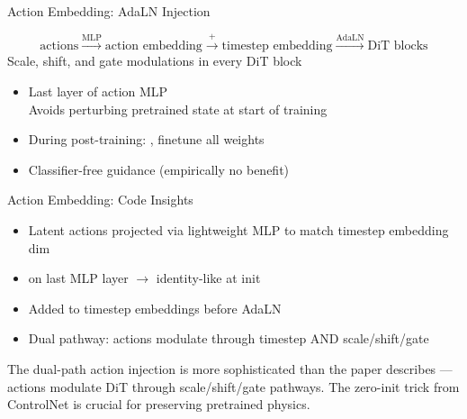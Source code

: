 \begin{frame}{Action Embedding: AdaLN Injection}
\begin{eqbox}
\begin{equation*}
\text{actions} \xrightarrow{\text{MLP}}
  \text{action embedding}
  \xrightarrow{+}
  \text{timestep embedding}
  \xrightarrow{\text{AdaLN}}
  \text{DiT blocks}
\end{equation*}
{\small Scale, shift, and gate modulations
in every DiT block}
\end{eqbox}

\vspace{0.5em}
\begin{itemize}
    \item Last layer of action MLP
          \citep{zhang2023adding}\\
          {\small Avoids perturbing pretrained state
          at start of training}
    \item During post-training: ,
          finetune all weights
    \item Classifier-free guidance 
          (empirically no benefit)
\end{itemize}
\end{frame}

\begin{frame}{Action Embedding: Code Insights}
\begin{methodbox}
\begin{itemize}
    \item Latent actions projected via lightweight MLP
          to match timestep embedding dim
    \item {} on last MLP layer
          $\rightarrow$ identity-like at init
    \item Added to timestep embeddings before AdaLN
    \item Dual pathway: actions modulate through
           timestep AND scale/shift/gate
\end{itemize}
\end{methodbox}

\vspace{0.5em}
\begin{softbox}
 The dual-path action injection is more
sophisticated than the paper describes --- actions
modulate DiT through 
scale/shift/gate pathways. The zero-init trick from
ControlNet is crucial for preserving pretrained physics.
\end{softbox}
\end{frame}

